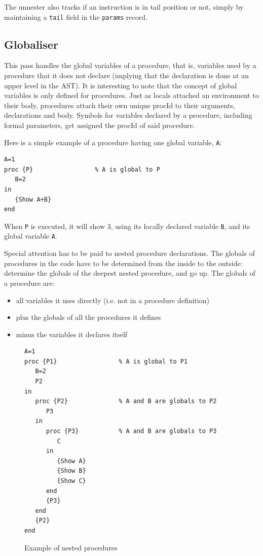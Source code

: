 \documentclass[a4paper]{memoir}
\begin{document}
The unnester also tracks if an instruction is in tail position or not, simply by
maintaining a \lstinline!tail! field in the \lstinline!params! record. 

\subsection{Globaliser}\label{sec:arch:globaliser}            
This pass handles the global variables of a procedure, that is, variables used
by a procedure that it does not declare (implying that the declaration is done
at an upper level in the AST). It is interesting to note that the concept of global variables is only defined for procedures.
Just as locals attached an environment to their body, procedures attach their own unique procId to their arguments, declarations and body.
Symbols for variables declared by a procedure, including formal parameters, get assigned the procId of said procedure.

Here is a simple example of a procedure having one global variable,
\lstinline!A!:
\begin{lstlisting}
A=1
proc {P}                 % A is global to P
   B=2
in
   {Show A+B}
end
\end{lstlisting}

When \lstinline!P! is executed, it will show 3, using its locally declared
variable \lstinline!B!, and its global variable \lstinline!A!.

Special attention has to be paid to nested procedure declarations.
The globals of procedures in the code have to be determined from the inside to the outside: determine the globals of the deepest nested procedure, and go up. 
The globals of a procedure are:
\begin{itemize}
  \item all variables it uses directly (i.e. not in a procedure definition)
  \item plus the globals of all the procedures it defines
  \item minus the variables it declares itself
\end{itemize}

\begin{figure}[h]
\begin{lstlisting}
A=1
proc {P1}                 % A is global to P1
   B=2
   P2
in
   proc {P2}              % A and B are globals to P2
      P3 
   in
      proc {P3}           % A and B are globals to P3
         C
      in
         {Show A}
         {Show B}
         {Show C}
      end
      {P3}
   end
   {P2}
end
\end{lstlisting}
\caption{Example of nested procedures}
\label{fig:nestedex}
\end{figure}
\end{document}
